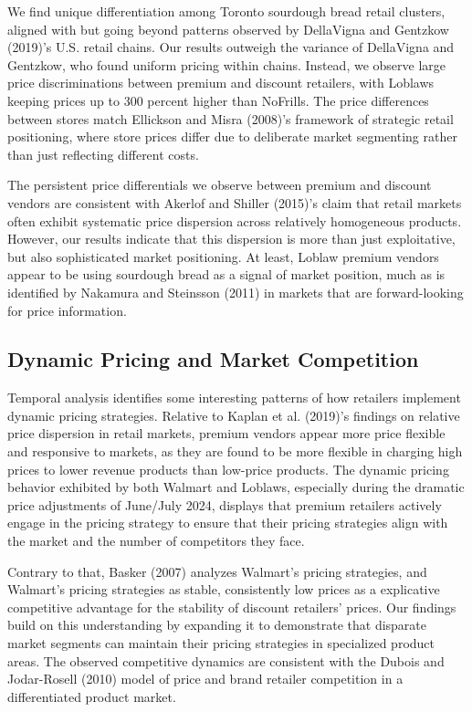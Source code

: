 \documentclass[
  letterpaper,
  DIV=11,
  numbers=noendperiod]{scrartcl}
\begin{document}
We find unique differentiation among Toronto sourdough bread retail
clusters, aligned with but going beyond patterns observed by DellaVigna
and Gentzkow (2019)'s U.S. retail chains. Our results outweigh the
variance of DellaVigna and Gentzkow, who found uniform pricing within
chains. Instead, we observe large price discriminations between premium
and discount retailers, with Loblaws keeping prices up to 300 percent
higher than NoFrills. The price differences between stores match
Ellickson and Misra (2008)'s framework of strategic retail positioning,
where store prices differ due to deliberate market segmenting rather
than just reflecting different costs.

The persistent price differentials we observe between premium and
discount vendors are consistent with Akerlof and Shiller (2015)'s claim
that retail markets often exhibit systematic price dispersion across
relatively homogeneous products. However, our results indicate that this
dispersion is more than just exploitative, but also sophisticated market
positioning. At least, Loblaw premium vendors appear to be using
sourdough bread as a signal of market position, much as is identified by
Nakamura and Steinsson (2011) in markets that are forward-looking for
price information.

\subsection{Dynamic Pricing and Market
Competition}\label{dynamic-pricing-and-market-competition}

Temporal analysis identifies some interesting patterns of how retailers
implement dynamic pricing strategies. Relative to Kaplan et al. (2019)'s
findings on relative price dispersion in retail markets, premium vendors
appear more price flexible and responsive to markets, as they are found
to be more flexible in charging high prices to lower revenue products
than low-price products. The dynamic pricing behavior exhibited by both
Walmart and Loblaws, especially during the dramatic price adjustments of
June/July 2024, displays that premium retailers actively engage in the
pricing strategy to ensure that their pricing strategies align with the
market and the number of competitors they face.

Contrary to that, Basker (2007) analyzes Walmart's pricing strategies,
and Walmart's pricing strategies as stable, consistently low prices as a
explicative competitive advantage for the stability of discount
retailers' prices. Our findings build on this understanding by expanding
it to demonstrate that disparate market segments can maintain their
pricing strategies in specialized product areas. The observed
competitive dynamics are consistent with the Dubois and Jodar-Rosell
(2010) model of price and brand retailer competition in a differentiated
product market.
\end{document}
